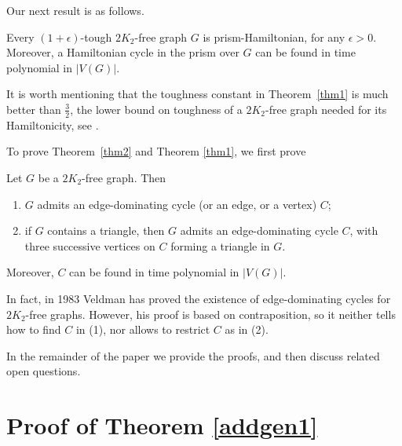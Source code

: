 \documentclass[runningheads,a4paper]{llncs}
\begin{document}
Our next result is as follows.
\begin{theorem}\label{thm1}
Every $(1+\epsilon)$-tough $2K_2$-free graph $G$ is prism-Hamiltonian, for any $\epsilon>0$.
Moreover, a Hamiltonian cycle in the prism over $G$ can be found in time polynomial in $|V(G)|$.
\end{theorem}

It is worth mentioning that the toughness constant in Theorem~\ref{thm1} is much better
than $\frac{3}{2}$, the lower bound on toughness of a $2K_2$-free graph needed
for its Hamiltonicity, see \cite[Sect.~4]{broersma2014toughness}.

To prove Theorem~\ref{thm2} and Theorem \ref{thm1}, we first prove
\begin{theorem}\label{addgen1} 
Let $G$ be a $2K_2$-free graph. Then
\begin{enumerate}
\item $G$ admits an edge-dominating cycle (or an edge, or a vertex) $C$; 
\item if $G$ contains a triangle, then $G$ admits 
an edge-dominating cycle $C$, with three successive vertices on $C$ forming a triangle in $G$. 
\end{enumerate}
Moreover, $C$ can be found in time polynomial in $|V(G)|$.
\end{theorem}

In fact, in 1983 Veldman \cite{veldman83} has proved the existence of
edge-dominating cycles for $2K_2$-free graphs. However, his proof is based on
contraposition, so it neither tells how to find $C$ in (1), nor
allows to restrict $C$ as in (2).

In the remainder of the paper we provide the proofs, and then discuss related 
open questions.


\section{Proof of Theorem \ref{addgen1}}
\end{document}
